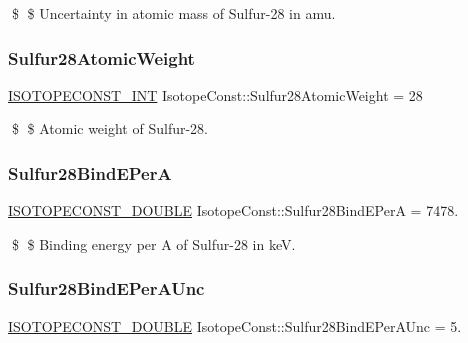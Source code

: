 \$ \$ Uncertainty in atomic mass of Sulfur-\/28 in amu. \mbox{\label{group___isotope_const-_sulfur-_s28_ga3cbc52f3afaf867d9c9bd57f68b3a2bb}} 
\subsubsection{\texorpdfstring{Sulfur28\+Atomic\+Weight}{Sulfur28AtomicWeight}}
{\footnotesize\ttfamily \mbox{\hyperlink{group___isotope_const-_macros_ga5f18360b3e99483a35c32d789e62621c}{I\+S\+O\+T\+O\+P\+E\+C\+O\+N\+S\+T\+\_\+\+I\+NT}} Isotope\+Const\+::\+Sulfur28\+Atomic\+Weight = 28}

\$ \$ Atomic weight of Sulfur-\/28. \mbox{\label{group___isotope_const-_sulfur-_s28_ga11c50413357a08d4e56fe1d9637c085a}} 
\subsubsection{\texorpdfstring{Sulfur28\+Bind\+E\+PerA}{Sulfur28BindEPerA}}
{\footnotesize\ttfamily \mbox{\hyperlink{group___isotope_const-_macros_ga8f45a7272ce02c0b4c65c44636ed719a}{I\+S\+O\+T\+O\+P\+E\+C\+O\+N\+S\+T\+\_\+\+D\+O\+U\+B\+LE}} Isotope\+Const\+::\+Sulfur28\+Bind\+E\+PerA = 7478.}

\$ \$ Binding energy per A of Sulfur-\/28 in keV. \mbox{\label{group___isotope_const-_sulfur-_s28_gadde1925f46fa9808c4d7eccc952355ad}} 
\subsubsection{\texorpdfstring{Sulfur28\+Bind\+E\+Per\+A\+Unc}{Sulfur28BindEPerAUnc}}
{\footnotesize\ttfamily \mbox{\hyperlink{group___isotope_const-_macros_ga8f45a7272ce02c0b4c65c44636ed719a}{I\+S\+O\+T\+O\+P\+E\+C\+O\+N\+S\+T\+\_\+\+D\+O\+U\+B\+LE}} Isotope\+Const\+::\+Sulfur28\+Bind\+E\+Per\+A\+Unc = 5.}

